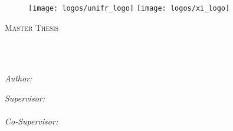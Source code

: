 

\begin{titlepage}
\begin{center}


\begin{figure}
  \centering
    \texttt{[image: logos/unifr\_logo]}
  \hfill
    \texttt{[image: logos/xi\_logo]}
  \vspace{30mm}
\end{figure}

{\scshape\LARGE \univname\par}\vspace{1.5cm} %
\textsc{\Large Master Thesis}\\[0.5cm] %
\HRule \\[0.4cm] %
{\huge \bfseries \ttitle\par}\vspace{0.4cm} %
\HRule \\[1.5cm] %

\begin{minipage}[t]{0.4\textwidth}
\begin{flushleft} \large
\emph{Author:}\\
\href{mailto://david.bucher@unifr.ch}{\authorname} %
\end{flushleft}
\end{minipage}
\begin{minipage}[t]{0.4\textwidth}
\begin{flushright} \large
\emph{Supervisor:} \\
\href{https://exascale.info/phil}{\supname} %
\\\vspace*{1ex}\emph{Co-Supervisor:} \\ %
\href{https://exascale.info/members/}{\cosupname} %
\end{flushright}
\end{minipage}\\[1cm]


\end{center}
\end{titlepage}
